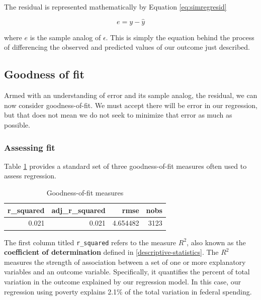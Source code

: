 \documentclass[
]{book}
\begin{document}
The residual is represented mathematically by Equation \eqref{eq:simregresid}

\begin{equation}
e = y - \hat{y}
\label{eq:simregresid}
\end{equation}

where \(e\) is the sample analog of \(\epsilon\). This is simply the equation behind the process of differencing the observed and predicted values of our outcome just described.

\hypertarget{goodness-of-fit}{%
\subsection{Goodness of fit}\label{goodness-of-fit}}

Armed with an understanding of error and its sample analog, the residual, we can now consider goodness-of-fit. We must accept there will be error in our regression, but that does not mean we do not seek to minimize that error as much as possible.

\hypertarget{assessing-fit}{%
\subsubsection*{Assessing fit}\label{assessing-fit}}


Table \ref{tab:simregexfit} provides a standard set of three goodness-of-fit measures often used to assess regression.

\begin{table}

\caption{\label{tab:simregexfit}Goodness-of-fit measures}
\centering
\begin{tabular}[t]{r|r|r|r}
\hline
r\_squared & adj\_r\_squared & rmse & nobs\\
\hline
0.021 & 0.021 & 4.654482 & 3123\\
\hline
\end{tabular}
\end{table}

The first column titled \texttt{r\_squared} refers to the measure \(R^2\), also known as the \textbf{coefficient of determination} defined in \ref{descriptive-statistics}. The \(R^2\) measures the strength of association between a set of one or more explanatory variables and an outcome variable. Specifically, it quantifies the percent of total variation in the outcome explained by our regression model. In this case, our regression using poverty explains 2.1\% of the total variation in federal spending.
\end{document}
